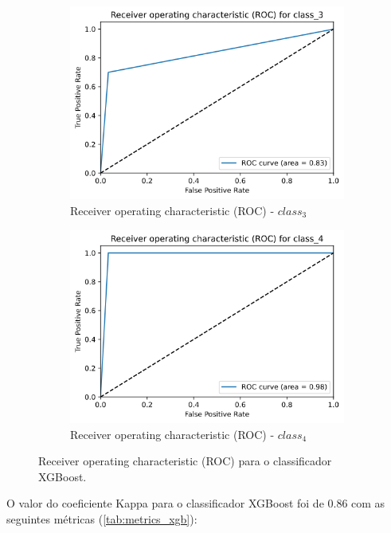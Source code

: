 \documentclass[
	article,			%
	11pt,				%
	oneside,			%
	a4paper,			%
	english,			%
	brazil,				%
	sumario=tradicional
	]{abntex2}
\begin{document}
\begin{figure}
\begin{subfigure}[b]{0.475\textwidth}
    \includegraphics[scale=0.375]{fig/xgb_roc3.png}
    \caption{Receiver operating characteristic (ROC) - $class_3$}
    \label{fig:xgb_roc3}
    \end{subfigure}
    \hfill
    \begin{subfigure}[b]{0.475\textwidth}
    \centering
    \includegraphics[scale=0.375]{fig/xgb_roc4.png}
    \caption{Receiver operating characteristic (ROC) - $class_4$}
    \label{fig:xgb_roc4}
    \end{subfigure}
    \caption{Receiver operating characteristic (ROC) para o classificador XGBoost.}
    \label{xgb_roc}
\end{figure}

O valor do coeficiente Kappa para o classificador XGBoost foi de $0.86$ com as seguintes métricas (\ref{tab:metrics_xgb}):
\end{document}
